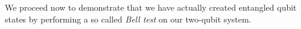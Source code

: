 We proceed now to demonstrate that we have actually created entangled qubit states by performing a so called {\it Bell test} on our two-qubit system.

\smallskip

%
%



